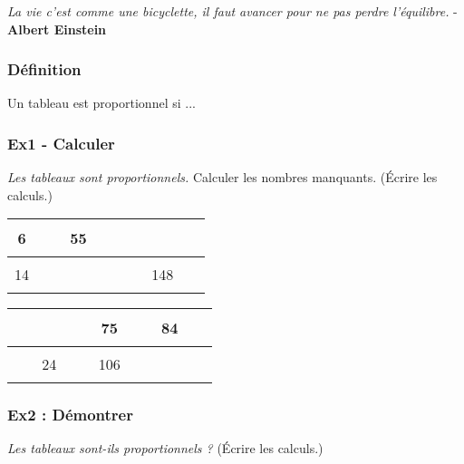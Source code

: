 



\begin{center}
  \textit{La vie c’est comme une bicyclette, il faut avancer pour ne pas perdre l’équilibre.} - \textbf{Albert Einstein}
\end{center}


\subsubsection*{Définition}

Un tableau est proportionnel si ...

\subsubsection*{Ex1 - Calculer} 

\textit{Les tableaux sont proportionnels.} Calculer les nombres manquants. (Écrire les calculs.)

\begin{multicols}{2}\noindent
  \begin{center} \begin{tabular}{|c|c|c|}  \hline
    6  &                                55 & $\phantom{\dfrac{azertyuiop}{O}}$ \\  \hline
    14 & $\phantom{\dfrac{azertyuiop}{O}}$ & 148\\  \hline
    \end{tabular} \end{center}

  \begin{center} \begin{tabular}{|c|c|c|}  \hline
    $\phantom{\dfrac{azertyuiop}{O}}$ &  75 & 84 \\  \hline
                                   24 & 106 & $\phantom{\dfrac{azertyuiop}{O}}$\\  \hline
  \end{tabular} \end{center}

\end{multicols}

\subsubsection*{Ex2 : Démontrer} 

\textit{Les tableaux sont-ils proportionnels ?} (Écrire les calculs.) 


